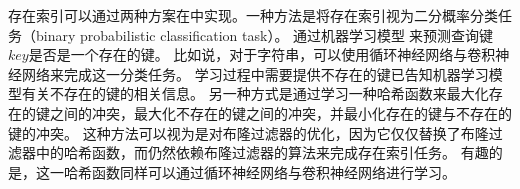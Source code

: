存在索引可以通过两种方案在{\li}中实现。一种方法是将存在索引视为二分概率分类任务（binary probabilistic classification task）。
通过机器学习模型来预测查询键$key$是否是一个存在的键。
比如说，对于字符串，{\li}可以使用循环神经网络与卷积神经网络来完成这一分类任务。
学习过程中需要提供不存在的键已告知机器学习模型有关不存在的键的相关信息。
另一种方式是通过学习一种哈希函数来最大化存在的键之间的冲突，最大化不存在的键之间的冲突，并最小化存在的键与不存在的键的冲突。
这种方法可以视为是对布隆过滤器的优化，因为它仅仅替换了布隆过滤器中的哈希函数，而仍然依赖布隆过滤器的算法来完成存在索引任务。
有趣的是，这一哈希函数同样可以通过循环神经网络与卷积神经网络进行学习。

